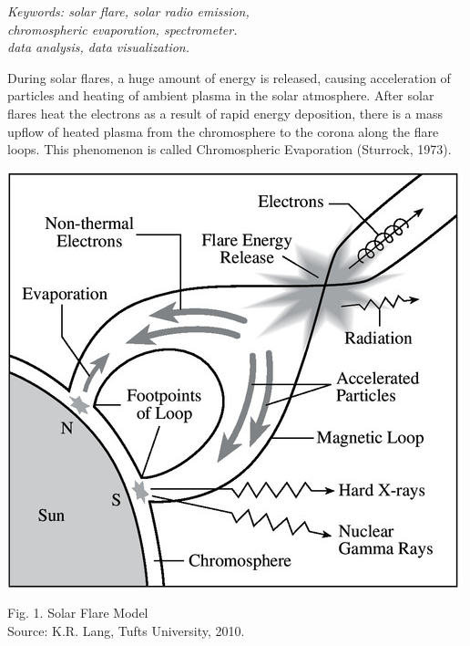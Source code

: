 \documentclass[a0paper,portrait]{baposter}
\begin{document}
\begin{poster}
{\textit{Keywords: solar flare, solar radio emission,}\\
\textit{chromospheric evaporation, spectrometer.}\\
\textit{data analysis, data visualization.}
}


{During solar flares, a huge amount of energy is released, causing acceleration
    of particles and heating of ambient plasma in the solar atmosphere.
    After solar flares heat the electrons as a result of rapid energy deposition,
    there is a mass upflow of heated plasma from the chromosphere to the corona
    along the flare loops. This phenomenon is called Chromospheric Evaporation (Sturrock, 1973).
    \begin{center}
        \includegraphics{figures/solar-flare-model.jpg}

        \scriptsize Fig. 1. Solar Flare Model\\
        \scriptsize Source: K.R. Lang, Tufts University, 2010.
    \end{center}
}


\end{poster}
\end{document}

